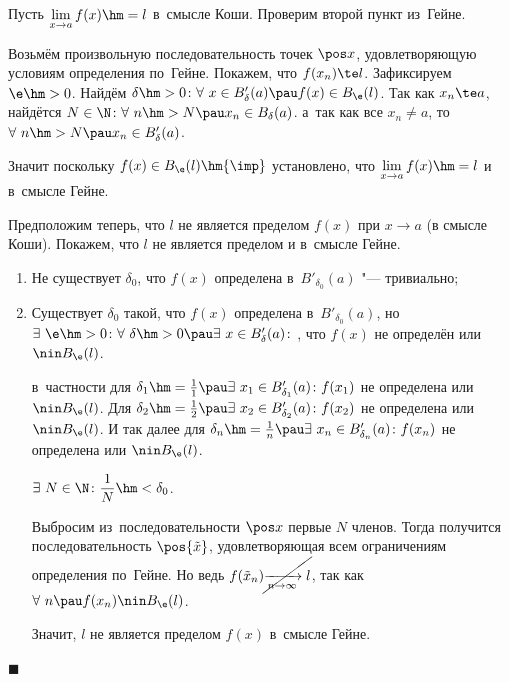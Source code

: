 \documentclass[a4paper,10pt,twoside]{article}
\newenvironment{Proof}
       {\par\noindent{\textbf{Доказательство.}}}
       {\hfill$\scriptstyle\blacksquare$}
\begin{document}
\begin{Proof}
Пусть $\lim\limits_{x\to a}f(x)\hm=l$ в~смысле Коши. Проверим второй пункт из~Гейне.

Возьмём произвольную последовательность точек $\pos x$, удовлетворяющую условиям определения по~Гейне. Покажем, что $f(x_n)\te l$. Зафиксируем $\e\hm>0$. Найдём $\delta\hm>0\colon
\forall\  x\in B'_\delta(a)\pau f(x)\in B_\e(l)$. Так как
$x_n\te a$, найдётся $N\in\N\colon \forall\  n\hm>N\pau
x_n\in B_\delta(a)$. а~так как все $x_n\neq a$, то $\forall\ 
n\hm>N\pau x_n\in B'_\delta(a)$.

Значит поскольку $f(x)\in B_\e(l)\hm{\imp}$ установлено, что $\lim\limits_{x\to a}f(x)\hm=l$ и в~смысле Гейне.

Предположим теперь, что $l$ не является пределом $f(x)$ при $x\to a$ (в смысле Коши). Покажем, что $l$ не является пределом и в~смысле Гейне.

\begin{enumerate}
    \item Не существует $\delta_0$, что $f(x)$ определена в~$B'_{\delta_0}(a)$ "--- тривиально;

    \item Существует $\delta_0$ такой, что $f(x)$ определена в~$B'_{\delta_0}(a)$, но $\exists\ \e\hm>0\colon
        \forall\  \delta\hm>0\pau \exists\  x\in B'_\delta(a)\colon$, что $f(x)$ не определён или $\nin B_\e(l)$.

        в~частности для $\delta_1\hm=\frac11\pau \exists\  x_1\in B'_{\delta_1}(a)\colon
        f(x_1)$ не определена или $\nin B_\e(l)$. Для $\delta_2\hm=\frac12\pau
        \exists\  x_2\in B'_{\delta_2}(a)\colon f(x_2)$ не определена или $\nin B_\e(l)$. И так далее для $\delta_n\hm=\frac1n\pau \exists\ 
        x_n\in B'_{\delta_n}(a)\colon f(x_n)$ не определена или $\nin B_\e(l)$.

        $\exists\  N\in\N\colon\dfrac1N\hm<\delta_0$.

        Выбросим из~последовательности $\pos x$ первые $N$ членов. Тогда получится последовательность $\pos{\tilde x}$, удовлетворяющая
        всем ограничениям
        определения по~Гейне. Но ведь $f(\tilde x_n)\cancel{\xrightarrow[n\to\infty]{\vphantom{\frac12} }l}$,
         так как $\forall\  n\pau f(x_n)\nin B_\e(l)$.

        Значит, $l$ не является пределом $f(x)$ в~смысле Гейне.
\end{enumerate}
\end{Proof}
\end{document}
